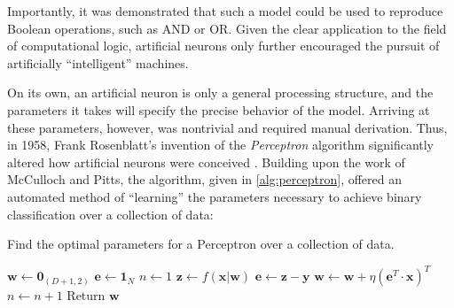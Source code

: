 \noindent Importantly,
it was demonstrated that such a model could be used to reproduce Boolean operations, such as AND or OR.
Given the clear application to the field of computational logic, artificial neurons only further encouraged the pursuit of artificially ``intelligent'' machines.

On its own, an artificial neuron is only a general processing structure, and the parameters it takes will specify the precise behavior of the model.
Arriving at these parameters, however, was nontrivial and required manual derivation.
Thus, in 1958, Frank Rosenblatt's invention of the \emph{Perceptron} algorithm significantly altered how artificial neurons were conceived \cite{Rosenblatt1958Perceptron}.
Building upon the work of McCulloch and Pitts, the algorithm, given in \ref{alg:perceptron}, offered an automated method of ``learning'' the parameters necessary to achieve binary classification over a collection of data:

\begin{algorithm}[H]
\caption{Find the optimal parameters for a Perceptron over a collection of data.}
\label{alg:perceptron}
\small
\begin{algorithmic}[1]
    \State $\mathbf{w} \gets \mathbf{0}_{(D + 1, 2)}$
    \State $\mathbf{e} \gets \mathbf{1}_{N}$
    \State $n \gets 1$
        \State $\mathbf{z} \gets f(\mathbf{x} | \mathbf{w})$
        \State $\mathbf{e} \gets \mathbf{z} - \mathbf{y}$
        \State $\mathbf{w} \gets \mathbf{w} + \eta (\mathbf{e}^T \cdot \mathbf{x})^T$
        \State $n \gets n + 1$
    \EndWhile
    \State Return $\mathbf{w}$
\EndProcedure
\end{algorithmic}
\end{algorithm}

